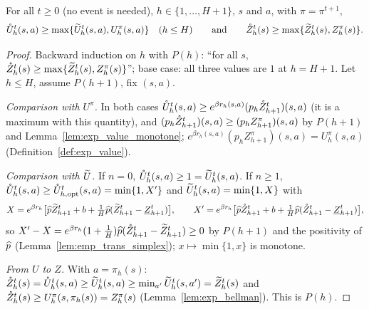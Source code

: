 \begin{lemma}\label{lem:ring_neg}
\leanok
{}
For all $t \ge 0$ (no event is needed), $h \in \{1, \dots, H + 1\}$, $s$ and $a$, with $\pi = \pi^{t+1}$,
\[
  \mathring{U}_h^t(s,a) \ge \max\{\widetilde{U}_h^t(s,a), U^\pi_h(s,a)\} \quad (h \le H)
  \qquad\text{and}\qquad
  \mathring{Z}_h^t(s) \ge \max\{\widetilde{Z}_h^t(s), Z^\pi_h(s)\} .
\]
\end{lemma}

\begin{proof}
\leanok
Backward induction on $h$ with $P(h)$: ``for all $s$, $\mathring{Z}_h^t(s) \ge \max\{\widetilde{Z}_h^t(s), Z^\pi_h(s)\}$'';
base case: all three values are $1$ at $h = H + 1$. Let $h \le H$, assume $P(h+1)$, fix $(s,a)$.

\emph{Comparison with $U^\pi$.} In both cases $\mathring{U}_h^t(s,a) \ge e^{\beta r_h(s,a)}(p_h\mathring{Z}^t_{h+1})(s,a)$ (it is a
maximum with this quantity), and $(p_h\mathring{Z}^t_{h+1})(s,a) \ge (p_hZ^\pi_{h+1})(s,a)$ by $P(h+1)$ and
Lemma~\ref{lem:exp_value_monotone}; $e^{\beta r_h(s,a)}(p_hZ^\pi_{h+1})(s,a) = U^\pi_h(s,a)$
(Definition~\ref{def:exp_value}).

\emph{Comparison with $\widetilde{U}$.} If $n = 0$, $\mathring{U}_h^t(s,a) \ge 1 = \widetilde{U}_h^t(s,a)$. If $n \ge 1$,
$\mathring{U}_h^t(s,a) \ge \mathring{U}^t_{h,\mathrm{opt}}(s,a) = \min\{1, X'\}$ and $\widetilde{U}_h^t(s,a) = \min\{1, X\}$ with
\[
  X = e^{\beta r_h}\big[\widehat{p}\widetilde{Z}^t_{h+1} + b + \tfrac1H\widehat{p}(\widetilde{Z}^t_{h+1} - \underline{Z}^t_{h+1})\big], \qquad
  X' = e^{\beta r_h}\big[\widehat{p}\mathring{Z}^t_{h+1} + b + \tfrac1H\widehat{p}(\mathring{Z}^t_{h+1} - \underline{Z}^t_{h+1})\big],
\]
so $X' - X = e^{\beta r_h}(1 + \frac1H)\widehat{p}(\mathring{Z}^t_{h+1} - \widetilde{Z}^t_{h+1}) \ge 0$ by $P(h+1)$ and the positivity
of $\widehat{p}$ (Lemma~\ref{lem:emp_trans_simplex}); $x \mapsto \min\{1, x\}$ is monotone.

\emph{From $U$ to $Z$.} With $a = \pi_h(s)$: $\mathring{Z}_h^t(s) = \mathring{U}_h^t(s,a) \ge \widetilde{U}_h^t(s,a) \ge \min_{a'}\widetilde{U}_h^t(s,a') = \widetilde{Z}_h^t(s)$
and $\mathring{Z}_h^t(s) \ge U^\pi_h(s, \pi_h(s)) = Z^\pi_h(s)$ (Lemma~\ref{lem:exp_bellman}). This is $P(h)$.
\end{proof}

